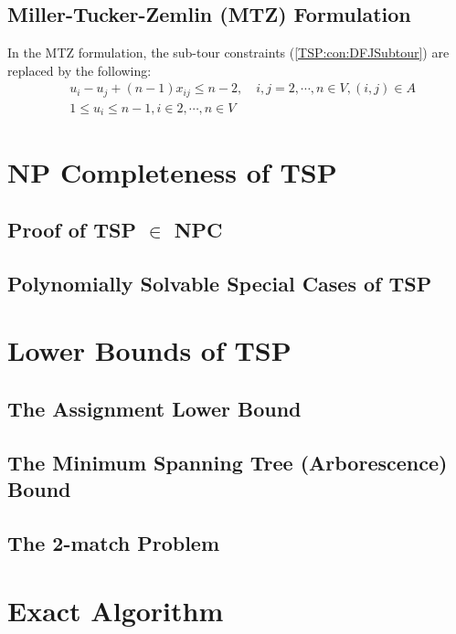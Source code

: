 				\subsection{Miller-Tucker-Zemlin (MTZ) Formulation}
					In the MTZ formulation, the sub-tour constraints (\ref{TSP:con:DFJSubtour}) are replaced by the following:
					\begin{align}
						&u_i - u_j + (n - 1) x_{ij} \le n - 2, \quad i, j = 2, \cdots, n \in V, (i, j) \in A\\
						&1 \le u_i \le n - 1, i \in 2, \cdots, n \in V
					\end{align}


			\section{NP Completeness of TSP}
				\subsection{Proof of TSP $\in$ NPC}

				\subsection{Polynomially Solvable Special Cases of TSP}

			\section{Lower Bounds of TSP}
				\subsection{The Assignment Lower Bound}

				\subsection{The Minimum Spanning Tree (Arborescence) Bound}

				\subsection{The 2-match Problem}

			\section{Exact Algorithm}

